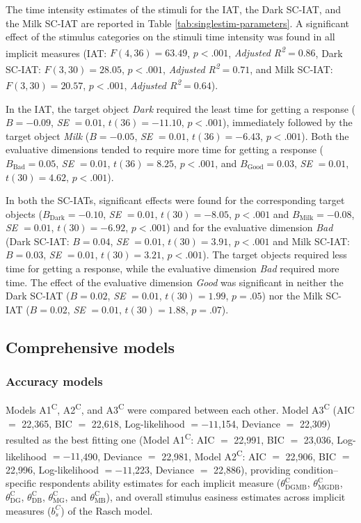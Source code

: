 \documentclass[12pt]{book}
\begin{document}
The time intensity estimates of the stimuli for the IAT, the Dark SC-IAT, and the Milk SC-IAT are reported in Table \ref{tab:singlestim-parameters}.
A significant effect of the stimulus categories on the stimuli time intensity was found in all implicit measures (IAT: $F(4,36) = 63.49$, $p<.001$, \emph{Adjusted R\textsuperscript{2}}$= 0.86$, Dark SC-IAT: $F(3,30) =28.05$, $p<.001$, \emph{Adjusted R\textsuperscript{2}}$= 0.71$, and Milk SC-IAT: $F(3,30) =20.57$, $p<.001$, \emph{Adjusted R\textsuperscript{2}}$= 0.64$). 

In the IAT, the target object \emph{Dark} required the least time for getting a response ($B = -0.09$, \emph{SE}  $= 0.01$, $t(36) = -11.10$, $p <. 001$), immediately followed by the target object \emph{Milk} ($B = -0.05$, \emph{SE}  $= 0.01$, $t(36) = -6.43$, $p <. 001$). 
	Both the evaluative dimensions tended to require more time for getting a response ($B_{\text{Bad}} = 0.05$, \emph{SE}  $= 0.01$, $t(36) = 8.25$, $p <. 001$, and $B_{\text{Good}} = 0.03$, \emph{SE}  $= 0.01$, $t(30) = 4.62$, $p <. 001$).

In both the SC-IATs, significant effects were found for the corresponding target objects ($B_{\text{Dark}} = -0.10$, \emph{SE}  $= 0.01$, $t(30) = -8.05$, $p <.001$ and $B_{\text{Milk}} = -0.08$, \emph{SE}  $= 0.01$, $t(30) = -6.92$, $p <.001$) and for the evaluative dimension \emph{Bad} (Dark SC-IAT: $B = 0.04$, \emph{SE}  $= 0.01$, $t(30) = 3.91$, $p <.001$ and Milk SC-IAT: $B = 0.03$, \emph{SE}  $= 0.01$, $t(30) = 3.21$, $p <.001$). 
	The target objects required less time for getting a response, while the evaluative dimension \emph{Bad} required more time.
	The effect of the evaluative dimension \emph{Good} was significant in neither the Dark SC-IAT  ($B = 0.02$, \emph{SE}  $= 0.01$, $t(30) = 1.99$, $p = .05$) nor the Milk SC-IAT ($B =0.02$, \emph{SE}  $= 0.01$, $t(30) = 1.88$, $p=.07$).

\subsection{Comprehensive models} 

\subsubsection{Accuracy models}

Models A1\textsuperscript{C}, A2\textsuperscript{C}, and A3\textsuperscript{C} were compared between each other. Model A3\textsuperscript{C} (AIC $=$ 22,365, BIC $=$ 22,618, Log-likelihood $= -11$,154, Deviance $=$ 22,309) resulted as the best fitting one (Model A1\textsuperscript{C}: AIC $=$ 22,991, BIC $=$ 23,036, Log-likelihood $= -11$,490, Deviance $=$ 22,981, Model A2\textsuperscript{C}: AIC $=$ 22,906, BIC $=$ 22,996, Log-likelihood $= -11$,223, Deviance $=$ 22,886), providing condition--specific respondents ability estimates for each implicit measure ($\theta_{\text{DGMB}}^\text{C}$, $\theta_{\text{MGDB}}^\text{C}$, $\theta_{\text{DG}}^\text{C}$, $\theta_{\text{DB}}^\text{C}$, $\theta_{\text{MG}}^\text{C}$, and $\theta_{\text{MB}}^\text{C}$), and overall stimulus easiness estimates across implicit measures ($b_s^C$) of the Rasch model.
\end{document}
